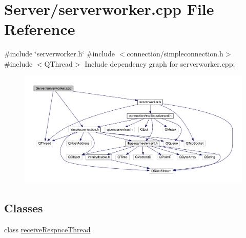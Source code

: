 \hypertarget{a00107}{}\section{Server/serverworker.cpp File Reference}
\label{a00107}
{\ttfamily \#include \char`\"{}serverworker.\+h\char`\"{}}\newline
{\ttfamily \#include $<$connection/simpleconnection.\+h$>$}\newline
{\ttfamily \#include $<$Q\+Thread$>$}\newline
Include dependency graph for serverworker.\+cpp\+:
\nopagebreak
\begin{figure}[H]
\begin{center}
\leavevmode
\includegraphics[width=350pt]{d1/dd6/a00108}
\end{center}
\end{figure}
\subsection*{Classes}
\begin{DoxyCompactItemize}
\item 
class \hyperlink{a00221}{receive\+Respnce\+Thread}
\end{DoxyCompactItemize}
